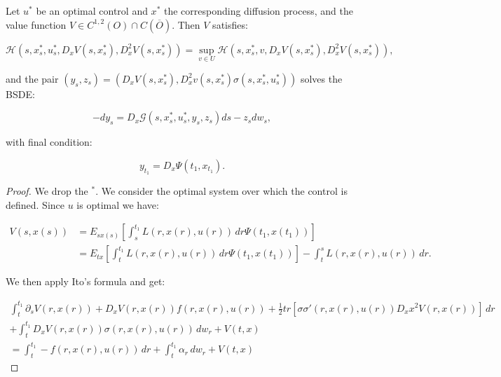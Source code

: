 \begin{theorem}\label{2-3-stochmaxprinc}
    Let $u^{\ast}$ be an optimal control and $x^{\ast}$ the corresponding diffusion process, and the value function 
    $V\in C^{1,2}(O)\cap C(\overline{O})$. Then $V$ satisfies:
    
    \begin{equation}\label{2-3-maxcond}
        \mathcal{H}(s,x_s^{\ast}, u_s^{\ast}, D_xV(s,x^{\ast}_s), D_x^2V(s,x^{\ast}_s)) = \sup_{v \in U}\mathcal{H}(s,x_s^{\ast}, v, D_xV(s,x^{\ast}_s), D_x^2V(s,x^{\ast}_s)),
    \end{equation}

    and the pair $(y_s,z_s)=\left(D_xV(s,x_s^{\ast}),D_x^2v(s,x_s^{\ast})\sigma(s,x_s^{\ast},u_s^{\ast})\right)$ solves the BSDE:

    \begin{equation}\label{2-3-maxprinc-BSDE}
        -dy_s = D_x\mathcal{G}(s,x_s^{\ast}, u_s^{\ast}, y_s, z_s)ds - z_sdw_s,
    \end{equation}

    with final condition:

    \begin{equation}\label{2-3-maxprinc-finalcond}
        y_{t_1} = D_x\Psi(t_1,x_{t_1}).
    \end{equation}

    \begin{proof}
        We drop the $^{\ast}$. We consider the optimal system over which the control is defined. 
        Since $u$ is optimal we have:

        \begin{align}
            V(s,x(s)) & = E_{sx(s)}\left[\int_s^{t_1} L(r,x(r),u(r))\,dr \Psi(t_1,x(t_1))\right] \\ 
            & = E_{tx}\left[\int_t^{t_1} L(r,x(r),u(r))\,dr \Psi(t_1,x(t_1))\right] - \int_t^s L(r,x(r),u(r))\,dr.  
        \end{align}

        We then apply Ito's formula and get:

        \begin{align}
            \int_t^{t_1} \partial_sV(r,x(r)) + D_xV(r,x(r))f(r,x(r),u(r)) + \frac{1}{2}tr\left[\sigma\sigma'(r,x(r),u(r))D_xx^2V(r,x(r))\right] \,dr \\
            + \int_t^{t_1} D_xV(r,x(r))\sigma(r,x(r),u(r))\,dw_r + V(t,x) \\
            = \int_t^{t_1} -f(r,x(r),u(r))\,dr + \int_t^{t_1}\alpha_r\,dw_r + V(t,x)
        \end{align}


\end{proof}
\end{theorem}
